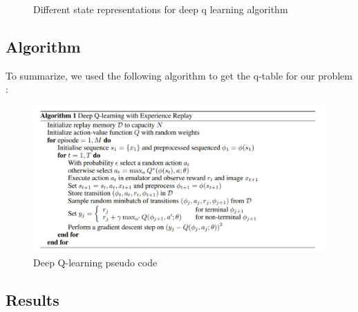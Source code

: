 \documentclass[a4paper]{article}
\begin{document}
\begin{figure}[h!]
    \qquad
    \caption{Different state representations for deep q learning algorithm }%
    \label{fig:example}%
    \end{figure}
	
\newpage

\subsection{Algorithm}
To summarize, we used the following algorithm to get the q-table for our problem : 

\begin{figure}[h!]
    \centering
    \includegraphics[scale = 0.4]{img/deep_q_algorithm.png}
    \caption{Deep Q-learning pseudo code }
    \label{fig:my_label}
\end{figure}


\subsection{Results}
\end{document}
